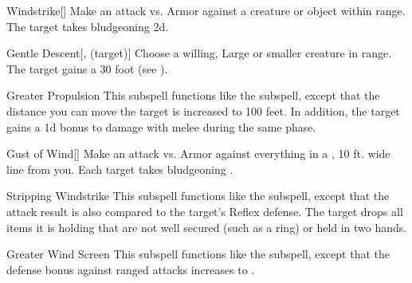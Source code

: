 \begin{ability}[\nth{1}]{Windstrike}[]
Make an attack vs. Armor against a creature or object within \rngmed range.
\hit The target takes bludgeoning  \plus2d.
\end{ability}
\vspace{0.25em}



\begin{ability}[\nth{2}]{Gentle Descent}[,  (target)]
Choose a willing, Large or smaller creature in \rngclose range.
The target gains a 30 foot  (see ).
\end{ability}
\vspace{0.25em}



\begin{ability}[\nth{2}]{Greater Propulsion}
This subspell functions like the  subspell, except that the distance you can move the target is increased to 100 feet.
In addition, the target gains a \plus1d bonus to damage with melee  during the same phase.
\end{ability}
\vspace{0.25em}



\begin{ability}[\nth{2}]{Gust of Wind}[]
Make an attack vs. Armor against everything in a \arealarge, 10 ft. wide line from you.
\hit Each target takes bludgeoning .
\end{ability}
\vspace{0.25em}



\begin{ability}[\nth{2}]{Stripping Windstrike}
This subspell functions like the  subspell, except that the attack result is also compared to the target's Reflex defense.
\hit The target drops all items it is holding that are not well secured (such as a ring) or held in two hands.
\end{ability}
\vspace{0.25em}



\begin{ability}[\nth{3}]{Greater Wind Screen}
This subspell functions like the  subspell, except that the defense bonus against ranged attacks increases to .
\end{ability}
\vspace{0.25em}



